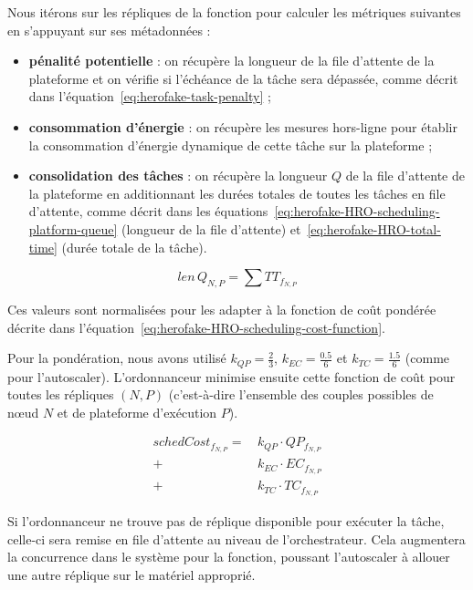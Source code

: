 Nous itérons sur les répliques de la fonction pour calculer les métriques suivantes en s'appuyant sur ses métadonnées :

\begin{itemize}
    \item \textbf{pénalité potentielle} : on récupère la longueur de la file d'attente de la plateforme et on vérifie si l'échéance de la tâche sera dépassée, comme décrit dans l'équation~\ref{eq:herofake-task-penalty} ;
    \item \textbf{consommation d'énergie} : on récupère les mesures hors-ligne pour établir la consommation d'énergie dynamique de cette tâche sur la plateforme ;
    \item \textbf{consolidation des tâches} : on récupère la longueur $Q$ de la file d'attente de la plateforme en additionnant les durées totales de toutes les tâches en file d'attente, comme décrit dans les équations~\ref{eq:herofake-HRO-scheduling-platform-queue} (longueur de la file d'attente) et~\ref{eq:herofake-HRO-total-time} (durée totale de la tâche). 
\end{itemize}

\begin{equation}
    len \, Q_{N, P} = \sum TT_{f_{N, P}}
\label{eq:herofake-HRO-scheduling-platform-queue}
\end{equation}

Ces valeurs sont normalisées pour les adapter à la fonction de coût pondérée décrite dans l'équation~\ref{eq:herofake-HRO-scheduling-cost-function}.


Pour la pondération, nous avons utilisé $k_{QP} = \frac{2}{3}$, $k_{EC} = \frac{0.5}{6}$ et $k_{TC} = \frac{1.5}{6}$ (comme pour l'autoscaler). L'ordonnanceur minimise ensuite cette fonction de coût pour toutes les répliques $(N, P)$ (c'est-à-dire l'ensemble des couples possibles de nœud $N$ et de plateforme d'exécution $P$).

\begin{equation}
\begin{split}
    schedCost_{{f}_{N, P}} = \, &k_{QP} \cdot QP_{{f}_{N, P}} \\
    + &k_{EC} \cdot {EC}_{{f}_{N, P}} \\
    + &k_{TC} \cdot TC_{{f}_{N, P}}
\end{split}
\label{eq:herofake-HRO-scheduling-cost-function}
\end{equation}

Si l'ordonnanceur ne trouve pas de réplique disponible pour exécuter la tâche, celle-ci sera remise en file d'attente au niveau de l'orchestrateur. Cela augmentera la concurrence dans le système pour la fonction, poussant l'autoscaler à allouer une autre réplique sur le matériel approprié.

